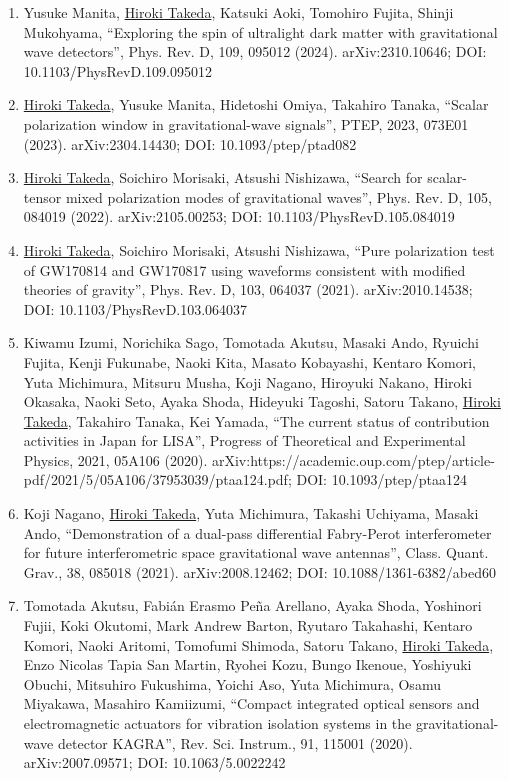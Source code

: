 \documentclass[uplatex, 12pt]{article}
\begin{document}
\begin{enumerate}
\item Yusuke Manita, \uline{Hiroki Takeda}, Katsuki Aoki, Tomohiro Fujita, Shinji Mukohyama, “Exploring the spin of ultralight dark matter with gravitational wave detectors”, Phys. Rev. D, 109, 095012 (2024). arXiv:2310.10646; DOI: 10.1103/PhysRevD.109.095012
\item \uline{Hiroki Takeda}, Yusuke Manita, Hidetoshi Omiya, Takahiro Tanaka, “Scalar polarization window in gravitational-wave signals”, PTEP, 2023, 073E01 (2023). arXiv:2304.14430; DOI: 10.1093/ptep/ptad082
\item \uline{Hiroki Takeda}, Soichiro Morisaki, Atsushi Nishizawa, “Search for scalar-tensor mixed polarization modes of gravitational waves”, Phys. Rev. D, 105, 084019 (2022). arXiv:2105.00253; DOI: 10.1103/PhysRevD.105.084019
\item \uline{Hiroki Takeda}, Soichiro Morisaki, Atsushi Nishizawa, “Pure polarization test of GW170814 and GW170817 using waveforms consistent with modified theories of gravity”, Phys. Rev. D, 103, 064037 (2021). arXiv:2010.14538; DOI: 10.1103/PhysRevD.103.064037
\item Kiwamu Izumi, Norichika Sago, Tomotada Akutsu, Masaki Ando, Ryuichi Fujita, Kenji Fukunabe, Naoki Kita, Masato Kobayashi, Kentaro Komori, Yuta Michimura, Mitsuru Musha, Koji Nagano, Hiroyuki Nakano, Hiroki Okasaka, Naoki Seto, Ayaka Shoda, Hideyuki Tagoshi, Satoru Takano, \uline{Hiroki Takeda}, Takahiro Tanaka, Kei Yamada, “The current status of contribution activities in Japan for LISA”, Progress of Theoretical and Experimental Physics, 2021, 05A106 (2020). arXiv:https://academic.oup.com/ptep/article-pdf/2021/5/05A106/37953039/ptaa124.pdf; DOI: 10.1093/ptep/ptaa124
\item Koji Nagano, \uline{Hiroki Takeda}, Yuta Michimura, Takashi Uchiyama, Masaki Ando, “Demonstration of a dual-pass differential Fabry-Perot interferometer for future interferometric space gravitational wave antennas”, Class. Quant. Grav., 38, 085018 (2021). arXiv:2008.12462; DOI: 10.1088/1361-6382/abed60
\item Tomotada Akutsu, Fabián Erasmo Peña Arellano, Ayaka Shoda, Yoshinori Fujii, Koki Okutomi, Mark Andrew Barton, Ryutaro Takahashi, Kentaro Komori, Naoki Aritomi, Tomofumi Shimoda, Satoru Takano, \uline{Hiroki Takeda}, Enzo Nicolas Tapia San Martin, Ryohei Kozu, Bungo Ikenoue, Yoshiyuki Obuchi, Mitsuhiro Fukushima, Yoichi Aso, Yuta Michimura, Osamu Miyakawa, Masahiro Kamiizumi, “Compact integrated optical sensors and electromagnetic actuators for vibration isolation systems in the gravitational-wave detector KAGRA”, Rev. Sci. Instrum., 91, 115001 (2020). arXiv:2007.09571; DOI: 10.1063/5.0022242

\end{enumerate}
\end{document}
